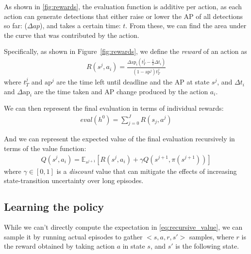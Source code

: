 As shown in \autoref{fig:rewards}, the evaluation function is additive per action, as each action can generate detections that either raise or lower the AP of all detections so far: ($\Delta ap$), and takes a certain time: $t$.
From these, we can find the area under the curve that was contributed by the action.

Specifically, as shown in Figure~\ref{fig:rewards}, we define the \emph{reward} of an action as
\begin{align}\label{eq:advanced}
R(s^j,a_i) = \frac{\Delta \text{ap}_i (t_T^j-\frac{1}{2}\Delta t_i)}{(1-\text{ap}^j)t_T^j}
\end{align}
where $t_T^j$ and $\text{ap}^j$ are the time left until deadline and the AP at state $s^j$, and $\Delta t_i$ and $\Delta \text{ap}_i$ are the time taken and AP change produced by the action $a_i$.


We can then represent the final evaluation in terms of individual rewards:
\begin{align}
eval(h^0) = \sum_{j=0}^J R(s_j,a^{j})
\end{align}

And we can represent the expected value of the final evaluation recursively in terms of the value function:
\begin{align} \label{eq:recursive_value}
Q(s^j,a_i) = \mathbb{E}_{s^{j+1}} [R(s^j,a_i) + \gamma Q(s^{j+1},\pi(s^{j+1}))]
\end{align}
where $\gamma \in [0,1]$ is a \emph{discount} value that can mitigate the effects of increasing state-transition uncertainty over long episodes.

\subsection{Learning the policy}
While we can't directly compute the expectation in \eqref{eq:recursive_value}, we can sample it by running actual episodes to gather $<s,a,r,s'>$ samples, where $r$ is the reward obtained by taking action $a$ in state $s$, and $s'$ is the following state.



